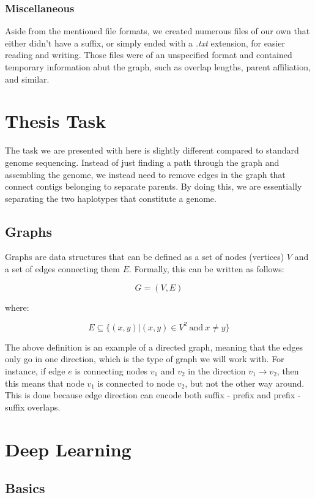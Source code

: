\documentclass[times, utf8, diplomski, english]{fer_eng}
\begin{document}
\subsubsection{Miscellaneous}

Aside from the mentioned file formats, we created numerous files of our own that either didn't have a suffix, or simply ended with a \textit{.txt} extension, for easier reading and writing. Those files were of an unspecified format and contained temporary information abut the graph, such as overlap lengths, parent affiliation, and similar.

\section{Thesis Task}

The task we are presented with here is slightly different compared to standard genome sequencing. Instead of just finding a path through the graph and assembling the genome, we instead need to remove edges in the graph that connect contigs belonging to separate parents. By doing this, we are essentially separating the two haplotypes that constitute a genome.

\subsection{Graphs}

Graphs are data structures that can be defined as a set of nodes (vertices) $V$ and a set of edges connecting them $E$. Formally, this can be written as follows:

\[ G = (V, E) \]

where:

\[ E \subseteq 	\{ (x, y)|(x, y) \in V^2 \mathrm{\ and\ } x \neq y \} \]

The above definition is an example of a directed graph, meaning that the edges only go in one direction, which is the type of graph we will work with. For instance, if edge $e$ is connecting nodes $v_1$ and $v_2$ in the direction $v_1 \rightarrow v_2$, then this means that node $v_1$ is connected to node $v_2$, but not the other way around. This is done because edge direction can encode both suffix - prefix and prefix - suffix overlaps.

\section{Deep Learning}

\subsection{Basics}
\end{document}
